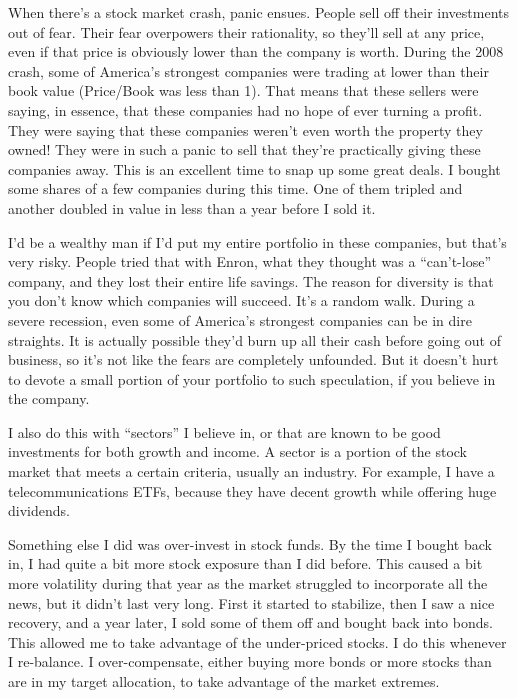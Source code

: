 When there's a stock market crash, panic ensues. People sell off their investments out of fear. Their fear overpowers their rationality, so they'll sell at any price, even if that price is obviously lower than the company is worth. During the 2008 crash, some of America's strongest companies were trading at lower than their book value (Price/Book was less than 1). That means that these sellers were saying, in essence, that these companies had no hope of ever turning a profit. They were saying that these companies weren't even worth the property they owned! They were in such a panic to sell that they're practically giving these companies away. This is an excellent time to snap up some great deals. I bought some shares of a few companies during this time. One of them tripled and another doubled in value in less than a year before I sold it.

I'd be a wealthy man if I'd put my entire portfolio in these companies, but that's very risky. People tried that with Enron, what they thought was a ``can't-lose'' company, and they lost their entire life savings. The reason for diversity is that you don't know which companies will succeed. It's a random walk. During a severe recession, even some of America's strongest companies can be in dire straights. It is actually possible they'd burn up all their cash before going out of business, so it's not like the fears are completely unfounded. But it doesn't hurt to devote a small portion of your portfolio to such speculation, if you believe in the company.

I also do this with ``sectors'' I believe in, or that are known to be good investments for both growth and income. A sector is a portion of the stock market that meets a certain criteria, usually an industry. For example, I have a telecommunications ETFs, because they have decent growth while offering huge dividends.

Something else I did was over-invest in stock funds. By the time I bought back in, I had quite a bit more stock exposure than I did before. This caused a bit more volatility during that year as the market struggled to incorporate all the news, but it didn't last very long. First it started to stabilize, then I saw a nice recovery, and a year later, I sold some of them off and bought back into bonds. This allowed me to take advantage of the under-priced stocks. I do this whenever I re-balance. I over-compensate, either buying more bonds or more stocks than are in my target allocation, to take advantage of the market extremes.

